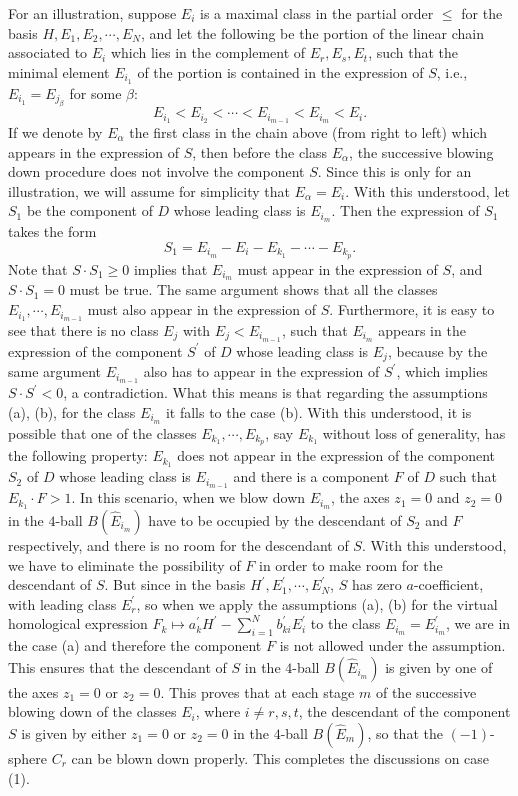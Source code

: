 \documentclass[11pt]{amsart}
\theoremstyle{plain}
\numberwithin{theorem}{section}
\theoremstyle{definition}
\begin{document}
For an illustration, suppose $E_i$ is a maximal class in the partial order $\leq$ for the basis
$H,E_1,E_2,\cdots, E_N$, and let the following be the portion of the linear chain associated to
$E_i$ which lies in the complement of $E_r,E_s,E_t$, such that the minimal element $E_{i_1}$ of the portion is contained in the expression of $S$, i.e., $E_{i_1}=E_{j_\beta}$ for some $\beta$:
$$
E_{i_1}<E_{i_2}<\cdots < E_{i_{m-1}}<E_{i_m}<E_i.
$$
If we denote by $E_\alpha$ the first class in the chain above (from right to left) which appears in the expression of $S$, then before the class $E_\alpha$, the successive blowing down procedure does not involve the component $S$. Since this is only for an illustration, we will assume for simplicity that 
$E_\alpha=E_i$. With this understood, let $S_1$ be the component of $D$ whose leading class is
$E_{i_m}$. Then the expression of $S_1$ takes the form
$$
S_1=E_{i_m}-E_i-E_{k_1}-\cdots-E_{k_p}. 
$$
Note that $S\cdot S_1\geq 0$ implies that $E_{i_m}$ must appear in the expression of $S$, and 
$S\cdot S_1=0$ must be true. The same argument shows that all the classes $E_{i_1}, \cdots,
E_{i_{m-1}}$ must also appear in the expression of $S$. Furthermore, it is easy to see that there
is no class $E_j$ with $E_j<E_{i_{m-1}}$, such that $E_{i_m}$ appears in the expression of the component $S^\prime$ of $D$ whose leading class is $E_j$, because by the same argument $E_{i_{m-1}}$ also has to appear in the expression of $S^\prime$, which implies $S\cdot S^\prime<0$, a contradiction. 
What this means is that regarding the assumptions (a), (b), for the class $E_{i_m}$ it falls to the case (b). With this understood, it is possible that one of the classes $E_{k_1}, \cdots, E_{k_p}$, say $E_{k_1}$ without loss of generality, has the following property: $E_{k_1}$ does not appear in the expression of the component $S_2$ of $D$ whose leading class is $E_{i_{m-1}}$ and there is a component $F$ of $D$
such that $E_{k_1}\cdot F>1$. In this scenario, when we blow down $E_{i_m}$, the axes 
$z_1=0$ and $z_2=0$ in the $4$-ball $B(\hat{E}_{i_m})$ have to be occupied by the descendant of
$S_2$ and $F$ respectively, and there is no room for the descendant of $S$. With this understood, we have to eliminate the possibility of $F$ in order to make room for the descendant of $S$. But since 
in the basis $H^\prime,E_1^\prime, \cdots,E_N^\prime$, $S$ has zero $a$-coefficient, with leading class 
$E_{r}^\prime$, so when we apply the assumptions (a), (b) for the virtual homological expression 
$F_k\mapsto a_k^\prime H^\prime-\sum_{i=1}^N b_{ki}^\prime E_i^\prime$ to the class 
$E_{i_m}=E_{i_{m}}^\prime$, we are in the case (a) and therefore the component $F$ is not allowed 
under the assumption. This ensures that the descendant of $S$ in the $4$-ball $B(\hat{E}_{i_m})$
is given by one of the axes $z_1=0$ or $z_2=0$. This proves that at each stage $m$ of the successive blowing down of the classes $E_i$, where $i\neq r,s,t$, the descendant of the component $S$ is given by either 
$z_1=0$ or $z_2=0$ in the $4$-ball $B(\hat{E}_m)$, so that the $(-1)$-sphere $C_r$ can be blown down properly.
This completes the discussions on case (1). 
\end{document}
